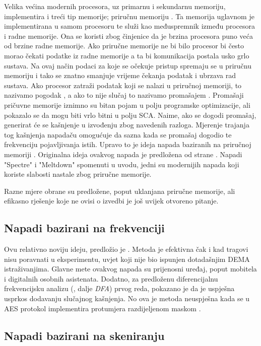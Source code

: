 \documentclass[times, utf8, diplomski]{fer}
\begin{document}
Velika većina modernih procesora, uz primarnu i sekundarnu memoriju, implementira i treći tip memorije; priručnu memoriju .
Ta memorija uglavnom je implementirana u samom procesoru te služi kao međuspremnik između procesora i radne memorije. Ona se koristi zbog činjenice da je brzina procesora puno veća od brzine radne memorije. Ako priručne memorije ne bi bilo procesor bi često morao čekati podatke iz radne memorije a ta bi komunikacija postala usko grlo  sustava. Na ovaj način podaci za koje se očekuje pristup spremaju se u priručnu memoriju i tako se znatno smanjuje vrijeme čekanja podatak i ubrzava rad sustava. Ako procesor zatraži podatak koji se nalazi u priručnoj memoriji, to nazivamo pogodak , a ako to nije slučaj to nazivamo promašajem . Promašaji pričuvne memorije iznimno su bitan pojam u polju programske optimizacije, ali pokazalo se da mogu biti vrlo bitni u polju SCA. Naime, ako se dogodi promašaj, generirat će se kašnjenje u izvođenju zbog navedenih razloga. Mjerenje trajanja tog kašnjenja napadaču omogućuje da sazna kada se promašaj dogodio te frekvenciju pojavljivanja istih. Upravo to je ideja napada baziranih na priručnoj memoriji . Originalna ideja ovakvog napada je predložena od strane \cite{kelsey1998side}. Napadi "Spectre" i "Meltdown" spomenuti u uvodu, jedni su modernijih napada koji koriste slabosti nastale zbog priručne memorije.

Razne mjere obrane su predložene, poput uklanjana priručne memorije, ali efikasno rješenje koje ne ovisi o izvedbi je još uvijek otvoreno pitanje.

\subsection{Napadi bazirani na frekvenciji}

Ovu relativno noviju ideju, predložio je \cite{tiu2005new}. Metoda je efektivna čak i kad tragovi nisu poravnati u eksperimentu, uvjet koji nije bio ispunjen dotadašnjim DEMA istraživanjima. Glavne mete ovakvog napada su prijenosni uređaj, poput mobitela i digitalnih osobnih asistenata. Dodatno, za predloženu diferencijalnu frekvencijsku analizu (, dalje \emph{DFA}) prvog reda, pokazano je da je uspješna usprkos dodavanju slučajnog kašnjenja. No ova je metoda neuspješna kada se u AES protokol implementira protumjera razdijeljenom maskom .

\subsection{Napadi bazirani na skeniranju}
\end{document}
